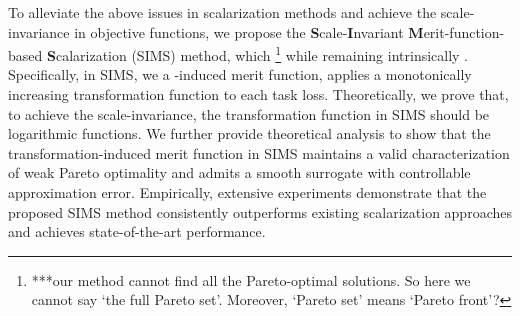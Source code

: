 \documentclass[sigconf]{acmart}
\begin{document}
To alleviate the above issues in scalarization methods and achieve the scale-invariance in objective functions, we propose the \textbf{S}cale-\textbf{I}nvariant \textbf{M}erit-function-based \textbf{S}calarization (SIMS) method, which \footnote{***our method cannot find all the Pareto-optimal solutions. So here we cannot say `the full Pareto set'. Moreover, `Pareto set' means `Pareto front'? } while remaining intrinsically . 
Specifically, in SIMS, we  a -induced merit function,  applies a monotonically increasing transformation function to each task loss. Theoretically, we prove that, to achieve the scale-invariance, the transformation function in SIMS should be logarithmic functions. We further provide theoretical analysis to show that the transformation-induced merit function in SIMS maintains a valid characterization of weak Pareto optimality and admits a smooth surrogate with controllable approximation error.
Empirically, extensive experiments demonstrate that the proposed SIMS method consistently outperforms existing scalarization approaches and achieves state-of-the-art performance.
\end{document}
